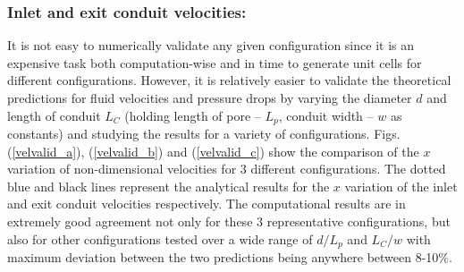 \documentclass[twocolumn,10pt,cleanfoot]{ihmtc}
\begin{document}
\subsubsection*{Inlet and exit conduit velocities:} It is not easy to numerically validate any given configuration since it is an expensive task both computation-wise and in time to generate unit cells for different configurations. However, it is relatively easier to validate the theoretical predictions for fluid velocities and pressure drops by varying the diameter $d$ and length of conduit $L_C$ (holding length of pore -- $L_p$, conduit width -- $w$ as constants) and studying the results for a variety of configurations. Figs. (\ref{velvalid_a}), (\ref{velvalid_b}) and (\ref{velvalid_c}) show the comparison of the $x$ variation of non-dimensional velocities for 3 different configurations. The dotted blue and black lines represent the analytical results for the $ x $ variation of the inlet and exit conduit velocities respectively. The computational results are in extremely good agreement not only for these 3 representative configurations, but also for other configurations tested over a wide range of $d/L_p$ and $L_C/w$ with maximum deviation between the two predictions being anywhere between 8-10$\%$.
%
\end{document}
